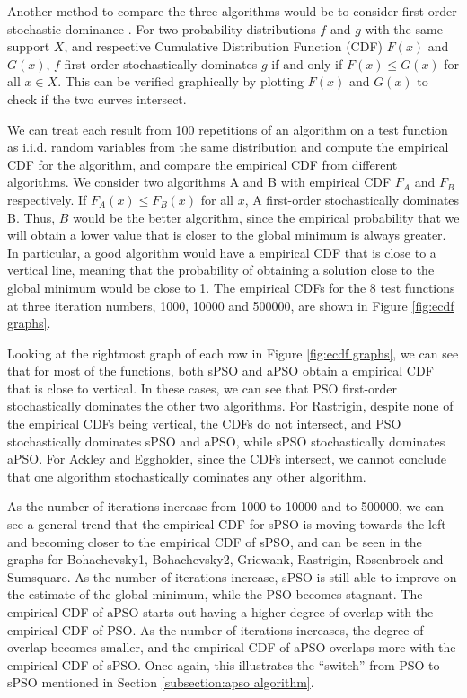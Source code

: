 \documentclass[12pt]{article}
\theoremstyle{definition}
\begin{document}
Another method to compare the three algorithms would be to consider first-order stochastic dominance \cite{hadar1969rules}. For two probability distributions $f$ and $g$ with the same support $X$, and respective Cumulative Distribution Function (CDF) $F(x)$ and $G(x)$, $f$ first-order stochastically dominates $g$ if and only if $F(x) \leq G(x)$ for all $x \in X$. This can be verified graphically by plotting $F(x)$ and $G(x)$ to check if the two curves intersect. \newline

We can treat each result from 100 repetitions of an algorithm on a test function as i.i.d. random variables from the same distribution and compute the empirical CDF for the algorithm, and compare the empirical CDF from different algorithms. We consider two algorithms A and B with empirical CDF $F_A$ and $F_B$ respectively. If $F_A(x) \leq F_B(x)$ for all $x$, A first-order stochastically dominates B. Thus, $B$ would be the better algorithm, since the empirical probability that we will obtain a lower value that is closer to the global minimum is always greater. In particular, a good algorithm would have a empirical CDF that is close to a vertical line, meaning that the probability of obtaining a solution close to the global minimum would be close to 1. The empirical CDFs for the 8 test functions at three iteration numbers, 1000, 10000 and 500000, are shown in Figure \ref{fig:ecdf graphs}. \newline

Looking at the rightmost graph of each row in Figure \ref{fig:ecdf graphs}, we can see that for most of the functions, both sPSO and aPSO obtain a empirical CDF that is close to vertical. In these cases, we can see that PSO first-order stochastically dominates the other two algorithms. For Rastrigin, despite none of the empirical CDFs being vertical, the CDFs do not intersect, and PSO stochastically dominates sPSO and aPSO, while sPSO stochastically dominates aPSO. For Ackley and Eggholder, since the CDFs intersect, we cannot conclude that one algorithm stochastically dominates any other algorithm. \newline

As the number of iterations increase from 1000 to 10000 and to 500000, we can see a general trend that the empirical CDF for sPSO is moving towards the left and becoming closer to the empirical CDF of sPSO, and can be seen in the graphs for Bohachevsky1, Bohachevsky2, Griewank, Rastrigin, Rosenbrock and Sumsquare. As the number of iterations increase, sPSO is still able to improve on the estimate of the global minimum, while the PSO becomes stagnant. The empirical CDF of aPSO starts out having a higher degree of overlap with the empirical CDF of PSO. As the number of iterations increases, the degree of overlap becomes smaller, and the empirical CDF of aPSO overlaps more with the empirical CDF of sPSO. Once again, this illustrates the ``switch'' from PSO to sPSO mentioned in Section \ref{subsection:apso algorithm}. \newline
\end{document}
